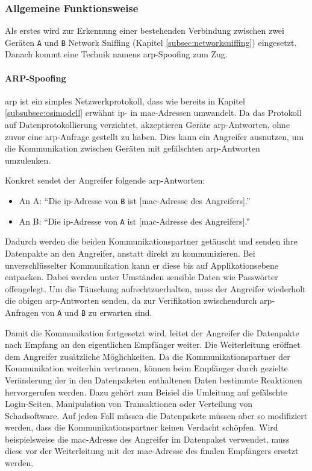 \documentclass[11pt, a4paper]{article}
\begin{document}
\subsubsection{Allgemeine Funktionsweise}
Als erstes wird zur Erkennung einer bestehenden Verbindung zwischen zwei Geräten \texttt{A} und \texttt{B} Network Sniffing (Kapitel \ref{subsec:networksniffing}) eingesetzt. Danach kommt eine Technik namens \gls{arp}-Spoofing zum Zug. 

\paragraph{ARP-Spoofing}
\gls{arp} ist ein simples Netzwerkprotokoll, dass wie bereits in Kapitel \ref{subsubsec:osimodell} erwähnt \gls{ip}- in \gls{mac}-Adressen umwandelt. Da das Protokoll auf Datenprotokollierung verzichtet, akzeptieren Geräte \gls{arp}-Antworten, ohne zuvor eine \gls{arp}-Anfrage gestellt zu haben. Dies kann ein Angreifer ausnutzen, um die Kommunikation zwischen Geräten mit gefälschten \gls{arp}-Antworten umzulenken. 

Konkret sendet der Angreifer folgende \gls{arp}-Antworten:
\begin{itemize}
	\item An A: ``Die \gls{ip}-Adresse von \texttt{B} ist [\gls{mac}-Adresse des Angreifers].''
	\item An B: ``Die \gls{ip}-Adresse von \texttt{A} ist [\gls{mac}-Adresse des Angreifers].''
\end{itemize}

Dadurch werden die beiden Kommunikationspartner getäuscht und senden ihre Datenpakte an den Angreifer, anstatt direkt zu kommunizieren. Bei unverschlüsselter Kommunikation kann er diese bis auf Applikationsebene entpacken. Dabei werden unter Umständen sensible Daten wie Passwörter offengelegt. Um die Täuschung aufrechtzuerhalten, muss der Angreifer wiederholt die obigen \gls{arp}-Antworten senden, da zur Verifikation zwischendurch \gls{arp}-Anfragen von \texttt{A} und \texttt{B} zu erwarten sind. 

Damit die Kommunikation fortgesetzt wird, leitet der Angreifer die Datenpakte nach Empfang an den eigentlichen Empfänger weiter. Die Weiterleitung eröffnet dem Angreifer zusätzliche Möglichkeiten. Da die Kommunikationspartner der Kommunikation weiterhin vertrauen, können beim Empfänger durch gezielte Veränderung der in den Datenpaketen enthaltenen Daten bestimmte Reaktionen hervorgerufen werden. Dazu gehört zum Beisiel die Umleitung auf gefälschte Login-Seiten, Manipulation von Transaktionen oder Verteilung von Schadsoftware. Auf jeden Fall müssen die Datenpakete müssen aber so modifiziert werden, dass die Kommunikationspartner keinen Verdacht schöpfen. Wird beispielsweise die \gls{mac}-Adresse des Angreifer im Datenpaket verwendet, muss diese vor der Weiterleitung mit der \gls{mac}-Adresse des finalen Empfängers ersetzt werden. 
\end{document}
